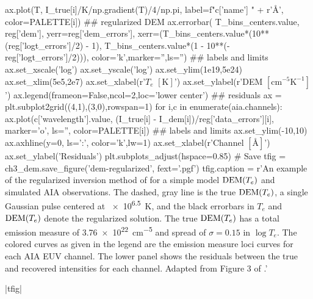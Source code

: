 \begin{pycode}
    ax.plot(T, I_true[i]/K/np.gradient(T)/4/np.pi, 
            label=f"{c['name']} " + r'\si{\angstrom}', color=PALETTE[i])
## regularized DEM
ax.errorbar(
    T_bins_centers.value, reg['dem'], 
    yerr=reg['dem_errors'],
    xerr=(T_bins_centers.value*(10**(reg['logt_errors']/2) - 1),
          T_bins_centers.value*(1 - 10**(-reg['logt_errors']/2))),
    color='k',marker='',ls='')
## labels and limits
ax.set_xscale('log')
ax.set_yscale('log')
ax.set_ylim(1e19,5e24)
ax.set_xlim(5e5,2e7)
ax.set_xlabel(r'$T_e$ $[\si{\kelvin}]$')
ax.set_ylabel(r'DEM $[\si{\cm\tothe{-5}\kelvin\tothe{-1}}]$')
ax.legend(frameon=False,ncol=2,loc='lower center')
## residuals
ax = plt.subplot2grid((4,1),(3,0),rowspan=1)
for i,c in enumerate(aia.channels):
    ax.plot(c['wavelength'].value, (I_true[i] - I_dem[i])/reg['data_errors'][i],
            marker='o', ls='', color=PALETTE[i])
## labels and limits
ax.set_ylim(-10,10)
ax.axhline(y=0, ls=':', color='k',lw=1)
ax.set_xlabel(r'Channel $[\si{\angstrom}]$')
ax.set_ylabel('Residuals')
plt.subplots_adjust(hspace=0.85)
# Save
tfig = ch3_dem.save_figure('dem-regularized', fext='.pgf')
tfig.caption = r'An example of the regularized inversion method of \citet{hannah_differential_2012} for a simple model $\textup{DEM}(T_e)$ and simulated AIA observations. The dashed, gray line is the true $\textup{DEM}(T_e)$, a single Gaussian pulse centered at \SI{e6.5}{\kelvin}, and the black errorbars in $T_e$ and $\textup{DEM}(T_e)$ denote the regularized solution. The true $\textup{DEM}(T_e)$ has a total emission measure of \SI{3.76e22}{\cm\tothe{-5}} and spread of $\sigma=0.15$ in $\log{T_e}$. The colored curves as given in the legend are the emission measure loci curves for each AIA EUV channel. The lower panel shows the residuals between the true and recovered intensities for each channel. Adapted from Figure 3 of \citet{hannah_differential_2012}.'
\end{pycode}
|tfig|

